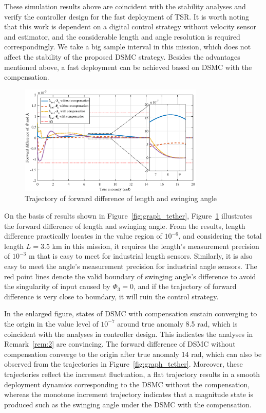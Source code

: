 \documentclass[10pt,onecolumn,draftcls]{IEEEtran}
\begin{document}
These simulation results above are coincident with the stability analyses and verify the controller design for the fast deployment of TSR. It is worth noting that this work is dependent on a digital control strategy without velocity sensor and estimator, and the considerable length and angle resolution is required correspondingly. We take a big sample interval in this mission, which does not affect the stability of the proposed DSMC strategy. Besides the advantages mentioned above, a fast deployment can be achieved based on DSMC with the compensation. 

\begin{figure}[htbp] 
\centering
\includegraphics[width=250pt]{forwarddifference.eps}
\caption{Trajectory of forward difference of length and swinging angle} \label{fig:graph_diff}
\end{figure}

On the basis of results shown in Figure~\ref{fig:graph_tether}, Figure~\ref{fig:graph_diff} illustrates the forward difference of length and swinging angle. From the results, length difference practically locates in the value region of $10^{-6}$, and considering the total length $L=3.5$ km in this mission, it requires the length's measurement precision of $10^{-3} $ m that is easy to meet for industrial length sensors. Similarly, it is also easy to meet the angle's measurement precision for industrial angle sensors. The red point lines denote the valid boundary of swinging angle's difference to avoid the singularity of input caused by $\Phi_3=0$, and if the trajectory of forward difference is very close to boundary, it will ruin the control strategy. 

In the enlarged figure, states of DSMC with compensation sustain converging to the origin in the value level of $10^{-7}$ around true anomaly 8.5 rad, which is coincident with the analyses in controller design. This indicates the analyses in Remark~\ref{rem:2} are convincing. The forward difference of DSMC without compensation converge to the origin after true anomaly 14 rad, which can also be observed from the trajectories in Figure~\ref{fig:graph_tether}. Moreover, these trajectories reflect the increment fluctuation, a flat trajectory results in a smooth deployment dynamics corresponding to the DSMC without the compensation, whereas the monotone increment trajectory indicates that a magnitude state is produced such as the swinging angle under the DSMC with the compensation.
\end{document}

